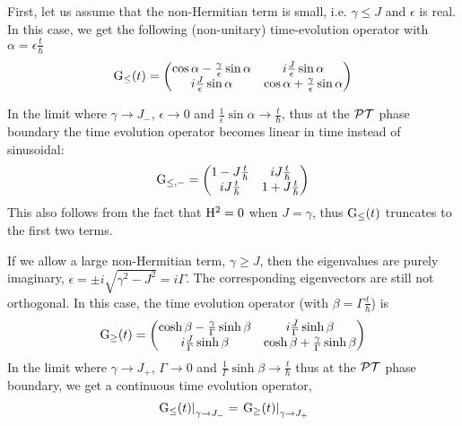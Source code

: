 First, let us assume that the non-Hermitian term is small, i.e. \( \gamma \leq
J \) and \( \epsilon \) is real. In this case, we get the following
(non-unitary) time-evolution operator with \( \alpha = \epsilon \frac{t}{\hbar}
\)
\begin{equation}
  \mathrm{G}_{\leq} \!\left(t\right) = \begin{pmatrix}
    \cos \alpha - \frac{\gamma}{\epsilon} \sin \alpha &
    i \frac{J}{\epsilon} \sin \alpha \\
    i \frac{J}{\epsilon} \sin \alpha &
    \cos \alpha + \frac{\gamma}{\epsilon} \sin \alpha
  \end{pmatrix}
\end{equation}

In the limit where \( \gamma \rightarrow J_{-} \), \( \epsilon \rightarrow 0 \)
and \( \frac{1}{\epsilon} \sin \alpha \rightarrow \frac{t}{\hbar} \), thus at
the \(\mathcal{PT}\) phase boundary the time evolution operator becomes linear in time
instead of sinusoidal:
\begin{equation}
  \mathrm{G}_{\leq,-} = \begin{pmatrix}
    1-J\frac{t}{\hbar} & i J\frac{t}{\hbar} \\
    i J\frac{t}{\hbar} & 1+J\frac{t}{\hbar}
  \end{pmatrix}
\end{equation}
This also follows from the fact that \( \mathrm{H}^{2} = 0\) when \(J = \gamma\),
thus \( \mathrm{G}_{\leq} \!\left(t\right) \) truncates to the first two terms.

If we allow a large non-Hermitian term, \( \gamma \geq J \), then the
eigenvalues are purely imaginary, \( \epsilon = \pm i \sqrt{ \gamma^{2} - J^{2}
} = i \Gamma \). The corresponding eigenvectors are still not orthogonal. In
this case, the time evolution operator (with \( \beta = \Gamma \frac{t}{\hbar}
\)) is
\begin{equation}
  \mathrm{G}_{\geq} \!\left(t\right) = \begin{pmatrix}
    \cosh \beta - \frac{\gamma}{\Gamma} \sinh \beta &
    i \frac{J}{\Gamma} \sinh \beta \\
    i \frac{J}{\Gamma} \sinh \beta &
    \cosh \beta + \frac{\gamma}{\Gamma} \sinh \beta
  \end{pmatrix}
\end{equation}
In the limit where \( \gamma \rightarrow J_{+} \), \( \Gamma \rightarrow 0 \)
and \( \frac{1}{\Gamma} \sinh \beta \rightarrow \frac{t}{\hbar} \) thus at the
\(\mathcal{PT}\) phase boundary, we get a continuous time evolution operator,
\begin{equation}
  \left. \mathrm{G}_{\leq} \!\left(t\right) \right|_{\gamma \rightarrow J_{-}} = \left.
    \mathrm{G}_{\geq} \!\left(t\right) \right|_{\gamma \rightarrow J_{+}}
\end{equation}

